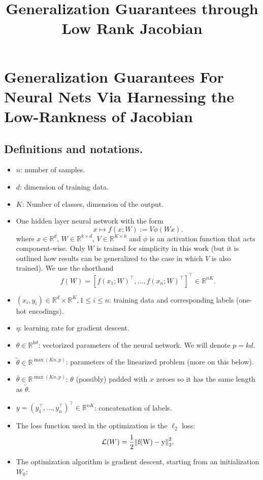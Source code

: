 \documentclass[a4paper]{article}
\title{Generalization Guarantees through Low Rank Jacobian}
\author{}
\date{}
\newcommand{\R}{\mathbb{R}}
\begin{document}
\maketitle


\section{Generalization Guarantees For Neural Nets Via Harnessing the Low-Rankness of Jacobian}


\subsection*{Definitions and notations.}
\begin{itemize}
\item $n$: number of samples.
\item $d$: dimension of training data.
\item $K$: Number of classes, dimension of the output.
\item One hidden layer neural network with the form
    \[
    x \mapsto f(x ; W):= V \phi(W x).
    \] 
    where $x\in\R^d$, $W\in \R^{k\times d}$, $V\in \R^{K\times k}$ and $\phi$ is an activation function that acts component-wise. Only $W$ is trained for simplicity in this work (but it is outlined how results can be generalized to the case in which $V$ is also trained). We use the shorthand
    \[
        f(W) = [f(x_1;W)^\top, \dots, f(x_n;W)^\top]^\top \in \R^{nK}.
    \] 
\item $(x_i, y_i) \in \R^d\times\R^K, 1\leq i\leq n$: training data and corresponding labels (one-hot encodings). 
\item $\eta$: learning rate for gradient descent.
\item $\theta \in \R^{kd}$: vectorized parameters of the neural network. We will denote $p=kd$.
\item $\tilde{\theta} \in \R^{\max(Kn,p)}$: parameters of the linearized problem (more on this below).
\item $\bar{\theta} \in \R^{\max(Kn,p)}$: $\theta$ (possibly) padded with $x$ zeroes so it has the same length as $\tilde{\theta}$.
\item $y = (y_1^\top,\dots, y_n^\top)^\top \in \R^{nK}$: concatenation of labels.
\item The loss function used in the optimization is the $\ell_2$ loss:
    \[
        \mathcal{L}(W) = \frac{1}{2} \mathrm{\left\lVert f(W)-y\right\rVert}_2^2.
    \] 
\item The optimization algorithm is gradient descent, starting from an initialization $W_0$:

\end{itemize}
\end{document}
